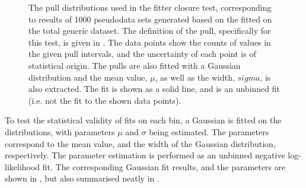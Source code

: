 \begin{figure}[htbp!]
{    }
    \caption{\label{fig:pull_distributions}The pull distributions used in the \Mbc fitter closure test, 
    corresponding to results of 1000 pseudodata sets generated based on the \PDF fitted on the total generic \MC dataset.
    The definition of the pull, specifically for this test, is given in .
    The data points show the counts of values in the given pull intervals, and the uncertainty of each point is of statistical origin.
    The pulls are also fitted with a Gaussian distribution and the mean value, $\mu$, as well as the width, $sigma$, is also extracted.
    The fit is shown as a solid line, and is an unbinned fit (i.e. not the fit to the shown data points).
    }
\end{figure}

To test the statistical validity of \Mbc fits on each bin, a Gaussian \PDF is fitted on the distributions, with parameters $\mu$ and $\sigma$ being estimated.
The parameters correspond to the mean value, and the width of the Gaussian distribution, respectively.
The parameter estimation is performed as an unbinned negative log-likelihood fit.
The corresponding Gaussian fit results, and the parameters are shown in , but also summarised neatly in .

